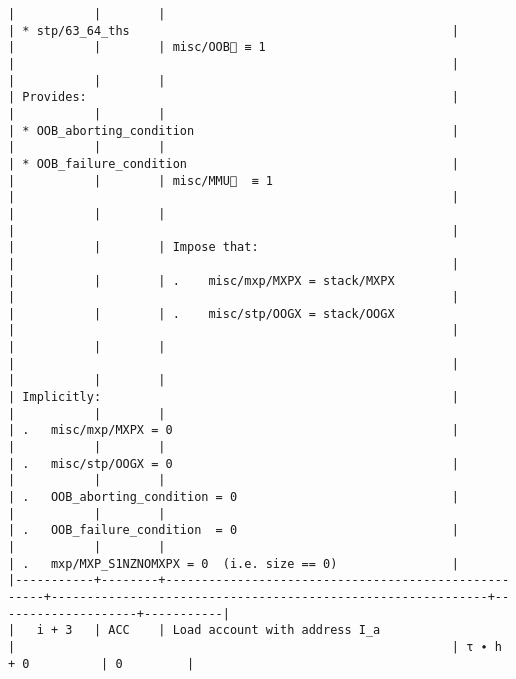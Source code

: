 \documentclass[varwidth=\maxdimen,margin=0.5cm,multi={verbatim}]{standalone}
\begin{document}
\begin{verbatim}
|           |        |                                                     | * stp/63_64_ths                                             |
|           |        | misc/OOB🚩 ≡ 1                                      |                                                             |
|           |        |                                                     | Provides:                                                   |
|           |        |                                                     | * OOB_aborting_condition                                    |
|           |        |                                                     | * OOB_failure_condition                                     |
|           |        | misc/MMU🚩  ≡ 1                                     |                                                             |
|           |        |                                                     |                                                             |
|           |        | Impose that:                                        |                                                             |
|           |        | .    misc/mxp/MXPX = stack/MXPX                     |                                                             |
|           |        | .    misc/stp/OOGX = stack/OOGX                     |                                                             |
|           |        |                                                     |                                                             |
|           |        |                                                     | Implicitly:                                                 |
|           |        |                                                     | .   misc/mxp/MXPX = 0                                       |
|           |        |                                                     | .   misc/stp/OOGX = 0                                       |
|           |        |                                                     | .   OOB_aborting_condition = 0                              |
|           |        |                                                     | .   OOB_failure_condition  = 0                              |
|           |        |                                                     | .   mxp/MXP_S1NZNOMXPX = 0  (i.e. size == 0)                |
|-----------+--------+-----------------------------------------------------+-------------------------------------------------------------+--------------------+-----------|
|   i + 3   | ACC    | Load account with address I_a                       |                                                             | τ ∙ h + 0          | 0         |

\end{verbatim}
\end{document}
